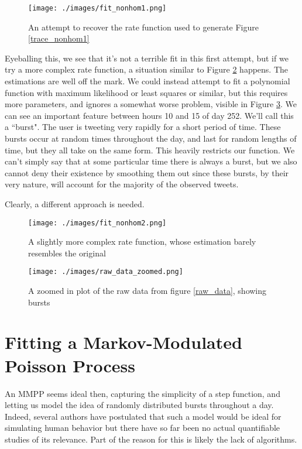 \begin{figure}[h]
\texttt{[image: ./images/fit\_nonhom1.png]}
\caption{An attempt to recover the rate function used to generate Figure \ref{trace_nonhom1}}
\label{fit_nonhom1}
\end{figure}

Eyeballing this, we see that it's not a terrible fit in this first attempt, but if we try a more complex rate function, a situation similar to Figure \ref{fit_nonhom2} happens. The estimations are well off the mark. We could instead attempt to fit a polynomial function with maximum likelihood or least squares or similar, but this requires more parameters, and ignores a somewhat worse problem, visible in Figure \ref{raw_data_zoomed}. We can see an important feature between hours 10 and 15 of day 252. We'll call this a ``burst". The user is tweeting very rapidly for a short period of time. These bursts occur at random times throughout the day, and last for random lengths of time, but they all take on the same form. This heavily restricts our function. We can't simply say that at some particular time there is always a burst, but we also cannot deny their existence by smoothing them out since these bursts, by their very nature, will account for the majority of the observed tweets.

Clearly, a different approach is needed.


\begin{figure}[h]
\texttt{[image: ./images/fit\_nonhom2.png]}
\caption{A slightly more complex rate function, whose estimation barely resembles the original}
\label{fit_nonhom2}
\end{figure}

\begin{figure}[h]
\texttt{[image: ./images/raw\_data\_zoomed.png]}
\caption{A zoomed in plot of the raw data from figure \ref{raw_data}, showing bursts}
\label{raw_data_zoomed}
\end{figure}

\clearpage

\section{Fitting a Markov-Modulated Poisson Process}

An MMPP seems ideal then, capturing the simplicity of a step function, and letting us model the idea of randomly distributed bursts throughout a day. Indeed, several authors have postulated that such a model would be ideal for simulating human behavior %
but there have so far been no actual quantifiable studies of its relevance. Part of the reason for this is likely the lack of algorithms.

